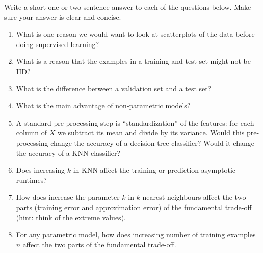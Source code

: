 \documentclass{article}
\def\blu#1{{\color{blu}#1}}
\def\enum#1{\begin{enumerate}#1\end{enumerate}}
\begin{document}
\blu{Write a short one or two sentence answer to each of the questions below}. Make sure your answer is clear and concise.

\enum{
\item What is one reason we would want to look at scatterplots of the data before doing supervised learning?
\item What is a reason that the examples in a training and test set might not be IID?
\item What is the difference between a validation set and a test set?
\item What is the main advantage of non-parametric models?
\item A standard pre-processing step is ``standardization'' of the features: for each column of $X$ we subtract its mean and divide by its variance. Would this pre-processing change the accuracy of a decision tree classifier? Would it change the accuracy of a KNN classifier?
\item Does increasing $k$ in KNN affect the training or prediction asymptotic runtimes?
\item How does increase the parameter $k$ in $k$-nearest neighbours affect the two parts (training error and approximation error) of the fundamental trade-off (hint: think of the extreme values).
\item For any parametric model, how does increasing number of training examples $n$ affect the two parts of the fundamental trade-off.
}
\end{document}
